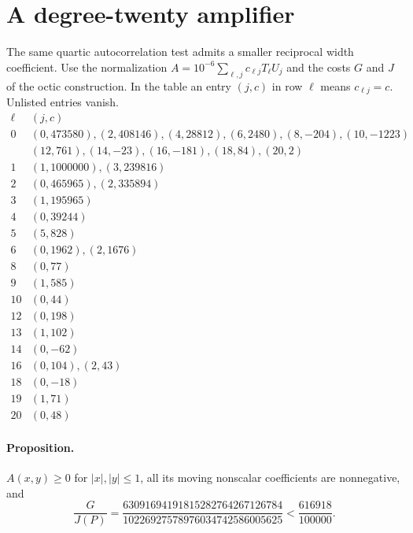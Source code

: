 \documentclass[11pt]{article}
\begin{document}
\section{A degree-twenty amplifier}
The same quartic autocorrelation test admits a smaller reciprocal width coefficient. Use the normalization $A=10^{-6}\sum_{\ell,j}c_{\ell j}T_\ell U_j$ and the costs $G$ and $J$ of the octic construction. In the table an entry $(j,c)$ in row $\ell$ means $c_{\ell j}=c$. Unlisted entries vanish.
\[
\begin{array}{c|l}
\ell &(j,c)\\ \hline
0 &(0,473580),(2,408146),(4,28812),(6,2480),(8,-204),(10,-1223)\\
  &(12,761),(14,-23),(16,-181),(18,84),(20,2)\\
1 &(1,1000000),(3,239816)\\
2 &(0,465965),(2,335894)\\
3 &(1,195965)\\
4 &(0,39244)\\
5 &(5,828)\\
6 &(0,1962),(2,1676)\\
8 &(0,77)\\
9 &(1,585)\\
10 &(0,44)\\
12 &(0,198)\\
13 &(1,102)\\
14 &(0,-62)\\
16 &(0,104),(2,43)\\
18 &(0,-18)\\
19 &(1,71)\\
20 &(0,48)
\end{array}
\]
\paragraph{Proposition.}
$A(x,y)\ge0$ for $|x|, |y|\le1$, all its moving nonscalar coefficients are nonnegative, and
\[
   \frac{G}{J(P)}=\frac{63091694191815282764267126784}{10226927578976034742586005625}
   <\frac{616918}{100000}.
\]
\end{document}
